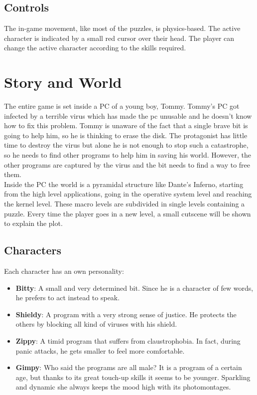 \documentclass[12pt, a4paper]{report}
\begin{document}
\section*{Controls}
The in-game movement, like most of the puzzles, is physics-based. The active character is indicated by a small red cursor over their head. The player can change the active character according to the skills required.



\chapter{Story and World}
The entire game is set inside a PC of a young boy, Tommy. Tommy’s PC got infected by a terrible virus which has made the pc unusable and he doesn’t know how to fix this problem. Tommy is unaware of the fact that a single brave bit is going to help him, so he is thinking to erase the disk. The protagonist has little time to destroy the virus but alone he is not enough to stop such a catastrophe, so he needs to find other programs to help him in saving his world. However, the other programs are captured by the virus and the bit needs to find a way to free them.\\
Inside the PC the world is a pyramidal structure like Dante’s Inferno, starting from the high level applications, going in the operative system level and reaching the kernel level. These macro levels are subdivided in single levels containing a puzzle.  Every time the player goes in a new level, a small cutscene will be shown to explain the plot.

\section*{Characters}
Each character has an own personality:
\begin{itemize}
\item \textbf{Bitty}: A small and very determined bit. Since he is a character of few words, he prefers to act instead to speak.
\item \textbf{Shieldy}: A program with a very strong sense of justice. He protects the others by blocking all kind of viruses with his shield.
\item \textbf{Zippy}: A timid program that suffers from claustrophobia. In fact, during panic attacks, he gets smaller to feel more comfortable.
\item \textbf{Gimpy}: Who said the programs are all male? It is a program of a certain age, but thanks to its great touch-up skills it seems to be younger. Sparkling and dynamic she always keeps the mood high with its photomontages.
\end{itemize}
\end{document}
